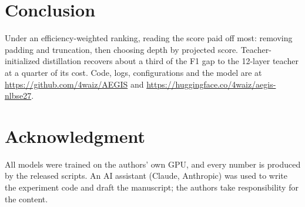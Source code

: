 \documentclass[10pt,conference]{IEEEtran}
\begin{document}
\section{Conclusion}
\label{sec:conclusion}
Under an efficiency-weighted ranking, reading the score paid off most: removing padding and truncation, then
choosing depth by projected score. Teacher-initialized distillation recovers about a third of the F1 gap to the
12-layer teacher at a quarter of its cost. Code, logs, configurations and the model are at
\url{https://github.com/4waiz/AEGIS} and \url{https://huggingface.co/4waiz/aegis-nlbse27}.

\section*{Acknowledgment}
All models were trained on the authors' own GPU, and every number is produced by the released scripts. An AI
assistant (Claude, Anthropic) was used to write the experiment code and draft the manuscript; the authors take
responsibility for the content.



\end{document}
